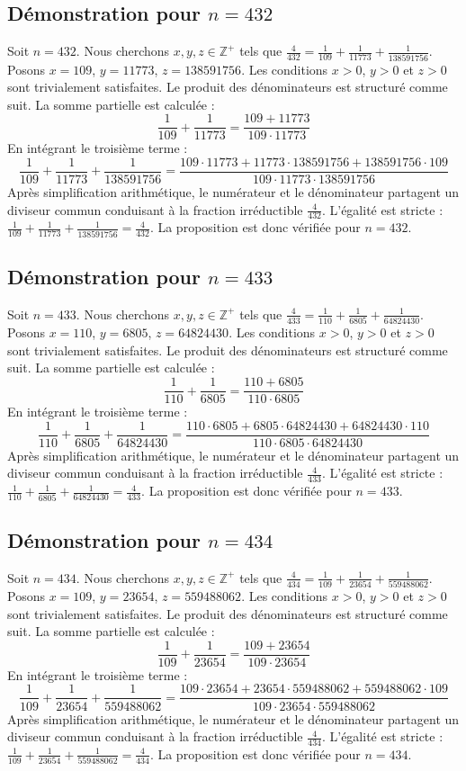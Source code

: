 \documentclass[11pt,a4paper]{article}
\begin{document}
\subsection{Démonstration pour $n = 432$}
Soit $n = 432$. Nous cherchons $x, y, z \in \mathbb{Z}^{+}$ tels que $\frac{4}{432} = \frac{1}{109} + \frac{1}{11773} + \frac{1}{138591756}$.
Posons $x = 109$, $y = 11773$, $z = 138591756$.
Les conditions $x > 0$, $y > 0$ et $z > 0$ sont trivialement satisfaites.
Le produit des dénominateurs est structuré comme suit. La somme partielle est calculée :
$$ \frac{1}{109} + \frac{1}{11773} = \frac{109+11773}{109 \cdot 11773} $$
En intégrant le troisième terme :
$$ \frac{1}{109} + \frac{1}{11773} + \frac{1}{138591756} = \frac{109 \cdot 11773 + 11773 \cdot 138591756 + 138591756 \cdot 109}{109 \cdot 11773 \cdot 138591756} $$
Après simplification arithmétique, le numérateur et le dénominateur partagent un diviseur commun conduisant à la fraction irréductible $\frac{4}{432}$.
L'égalité est stricte : $\frac{1}{109} + \frac{1}{11773} + \frac{1}{138591756} = \frac{4}{432}$.
La proposition est donc vérifiée pour $n = 432$.
\subsection{Démonstration pour $n = 433$}
Soit $n = 433$. Nous cherchons $x, y, z \in \mathbb{Z}^{+}$ tels que $\frac{4}{433} = \frac{1}{110} + \frac{1}{6805} + \frac{1}{64824430}$.
Posons $x = 110$, $y = 6805$, $z = 64824430$.
Les conditions $x > 0$, $y > 0$ et $z > 0$ sont trivialement satisfaites.
Le produit des dénominateurs est structuré comme suit. La somme partielle est calculée :
$$ \frac{1}{110} + \frac{1}{6805} = \frac{110+6805}{110 \cdot 6805} $$
En intégrant le troisième terme :
$$ \frac{1}{110} + \frac{1}{6805} + \frac{1}{64824430} = \frac{110 \cdot 6805 + 6805 \cdot 64824430 + 64824430 \cdot 110}{110 \cdot 6805 \cdot 64824430} $$
Après simplification arithmétique, le numérateur et le dénominateur partagent un diviseur commun conduisant à la fraction irréductible $\frac{4}{433}$.
L'égalité est stricte : $\frac{1}{110} + \frac{1}{6805} + \frac{1}{64824430} = \frac{4}{433}$.
La proposition est donc vérifiée pour $n = 433$.
\subsection{Démonstration pour $n = 434$}
Soit $n = 434$. Nous cherchons $x, y, z \in \mathbb{Z}^{+}$ tels que $\frac{4}{434} = \frac{1}{109} + \frac{1}{23654} + \frac{1}{559488062}$.
Posons $x = 109$, $y = 23654$, $z = 559488062$.
Les conditions $x > 0$, $y > 0$ et $z > 0$ sont trivialement satisfaites.
Le produit des dénominateurs est structuré comme suit. La somme partielle est calculée :
$$ \frac{1}{109} + \frac{1}{23654} = \frac{109+23654}{109 \cdot 23654} $$
En intégrant le troisième terme :
$$ \frac{1}{109} + \frac{1}{23654} + \frac{1}{559488062} = \frac{109 \cdot 23654 + 23654 \cdot 559488062 + 559488062 \cdot 109}{109 \cdot 23654 \cdot 559488062} $$
Après simplification arithmétique, le numérateur et le dénominateur partagent un diviseur commun conduisant à la fraction irréductible $\frac{4}{434}$.
L'égalité est stricte : $\frac{1}{109} + \frac{1}{23654} + \frac{1}{559488062} = \frac{4}{434}$.
La proposition est donc vérifiée pour $n = 434$.
\end{document}
